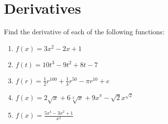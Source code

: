 \documentclass[letterpaper,12pt,fleqn]{article}
\begin{document}
\section*{Derivatives}

Find the derivative of each of the following functions:
\begin{enumerate}
  \setlength\itemsep{1in}
\item \(f(x)=3x^2-2x+1\)
\item \(f(t)=10t^3-9t^2+8t-7\)
\item \(f(r)=\frac{1}{2}r^{100}+\frac{1}{3}r^{50}-\pi r^{10}+e\)
\item \(f(x)=2\sqrt{x}+6\sqrt[3]{x}+9x^{\pi}-\sqrt{2}x^{\sqrt{2}}\)
\item \(f(x)=\frac{5x^4-3x^2+1}{x^2}\)
\end{enumerate}
\end{document}
